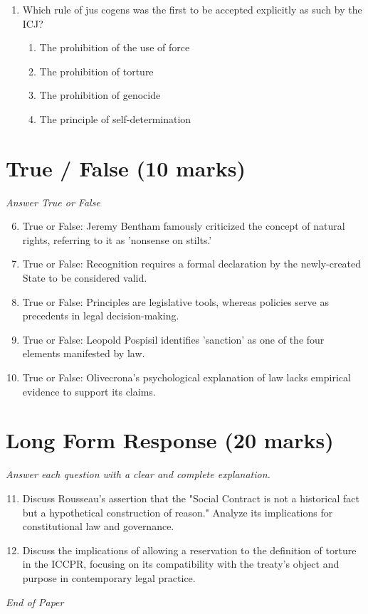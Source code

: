 \documentclass[12pt]{article}
\begin{document}
\begin{enumerate}[label=\arabic*.]
\begin{enumerate}[label=(\alph*)]
    \item Being obliged and having an obligation
    \item Corporeal and incorporeal rights
\end{enumerate}
\item Which rule of jus cogens was the first to be accepted explicitly as such by the ICJ?
\begin{enumerate}[label=(\alph*)]
    \item The prohibition of the use of force
    \item The prohibition of torture
    \item The prohibition of genocide
    \item The principle of self-determination
\end{enumerate}
\end{enumerate}

\section*{True / False (10 marks)}
\textit{Answer True or False}
\begin{enumerate}[label=\arabic*.]
\setcounter{enumi}{5}
\item True or False: Jeremy Bentham famously criticized the concept of natural rights, referring to it as 'nonsense on stilts.'
\item True or False: Recognition requires a formal declaration by the newly-created State to be considered valid.
\item True or False: Principles are legislative tools, whereas policies serve as precedents in legal decision-making.
\item True or False: Leopold Pospisil identifies 'sanction' as one of the four elements manifested by law.
\item True or False: Olivecrona's psychological explanation of law lacks empirical evidence to support its claims.
\end{enumerate}

\section*{Long Form Response (20 marks)}
\textit{Answer each question with a clear and complete explanation.}
\begin{enumerate}[label=\arabic*.]
\setcounter{enumi}{10}
\item Discuss Rousseau's assertion that the "Social Contract is not a historical fact but a hypothetical construction of reason." Analyze its implications for constitutional law and governance.
\item Discuss the implications of allowing a reservation to the definition of torture in the ICCPR, focusing on its compatibility with the treaty's object and purpose in contemporary legal practice.
\end{enumerate}

\vfill
\noindent\textit{End of Paper}
\end{document}
